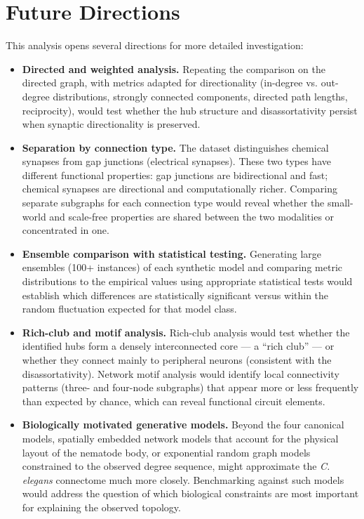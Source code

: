 \documentclass[12pt,a4paper]{report}
\begin{document}
\chapter{Future Directions}

This analysis opens several directions for more detailed investigation:

\begin{itemize}
    \item \textbf{Directed and weighted analysis.} Repeating the comparison on the directed graph, with metrics adapted for directionality (in-degree vs. out-degree distributions, strongly connected components, directed path lengths, reciprocity), would test whether the hub structure and disassortativity persist when synaptic directionality is preserved.

    \item \textbf{Separation by connection type.} The dataset distinguishes chemical synapses from gap junctions (electrical synapses). These two types have different functional properties: gap junctions are bidirectional and fast; chemical synapses are directional and computationally richer. Comparing separate subgraphs for each connection type would reveal whether the small-world and scale-free properties are shared between the two modalities or concentrated in one.

    \item \textbf{Ensemble comparison with statistical testing.} Generating large ensembles (100+ instances) of each synthetic model and comparing metric distributions to the empirical values using appropriate statistical tests would establish which differences are statistically significant versus within the random fluctuation expected for that model class.

    \item \textbf{Rich-club and motif analysis.} Rich-club analysis would test whether the identified hubs form a densely interconnected core — a ``rich club'' — or whether they connect mainly to peripheral neurons (consistent with the disassortativity). Network motif analysis would identify local connectivity patterns (three- and four-node subgraphs) that appear more or less frequently than expected by chance, which can reveal functional circuit elements.

    \item \textbf{Biologically motivated generative models.} Beyond the four canonical models, spatially embedded network models that account for the physical layout of the nematode body, or exponential random graph models constrained to the observed degree sequence, might approximate the \textit{C. elegans} connectome much more closely. Benchmarking against such models would address the question of which biological constraints are most important for explaining the observed topology.


\end{itemize}
\end{document}
